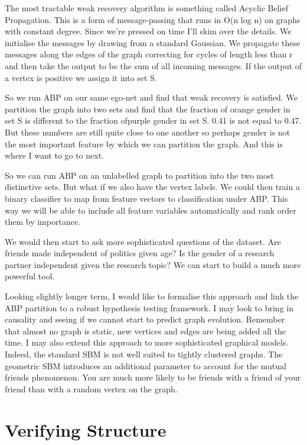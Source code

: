 \documentclass[]{article}
\begin{document}
The most tractable weak recovery algorithm is something called Acyclic Belief Propagation. This is a form of message-passing that runs in O(n log n) on graphs with constant degree. Since we’re pressed on time I’ll skim over the details. We initialise the messages by drawing from a standard Gaussian. We propagate these messages along the edges of the graph correcting for cycles of length less than r and then take the output to be the sum of all incoming messages. If the output of a vertex is positive we assign it into set S.

So we run ABP on our same ego-net and find that weak recovery is satisfied. We partition the graph into two sets and find that the fraction of orange gender in set S is different to the fraction ofpurple gender in set S. 0.41 is not equal to 0.47. But these numbers are still quite close to one another so perhaps gender is not the most important feature by which we can partition the graph. And this is where I want to go to next.

So we can run ABP on an unlabelled graph to partition into the two most distinctive sets. But what if we also have the vertex labels. We could then train a binary classifier to map from feature vectors to classification under ABP. This way we will be able to include all feature variables automatically and rank order them by importance.

We would then start to ask more sophisticated questions of the dataset. Are friends made independent of politics given age? Is the gender of a research partner independent given the research topic? We can start to build a much more powerful tool.

Looking slightly longer term, I would like to formalise this approach and link the ABP partition to a robust hypothesis testing framework. I may look to bring in causality and seeing if we cannot start to predict graph evolution. Remember that almost no graph is static, new vertices and edges are being added all the time. I may also extend this approach to more sophisticated graphical models. Indeed, the standard SBM is not well suited to tightly clustered graphs. The geometric SBM introduces an additional parameter to account for the mutual friends phenomenon. You are much more likely to be friends with a friend of your friend than with a random vertex on the graph.


\section{Verifying Structure}
\end{document}
